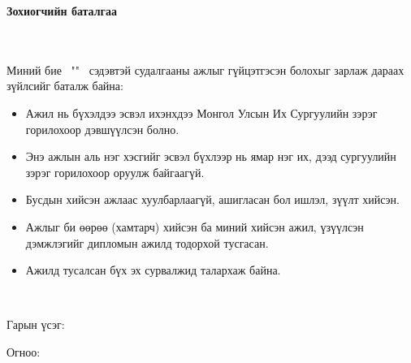 \makefrontpage
\maketitle

\doublespace

\begin{sloppy}
\begin{huge}
\textbf{Зохиогчийн баталгаа}
\end{huge} \\ \ \\ 
\doublespace
Миний бие \@author \ "\@title" \ сэдэвтэй судалгааны ажлыг гүйцэтгэсэн болохыг зарлаж дараах зүйлсийг баталж байна:
\begin{itemize}
\item Ажил нь бүхэлдээ эсвэл ихэнхдээ Монгол Улсын Их Сургуулийн зэрэг горилохоор дэвшүүлсэн болно.
\item Энэ ажлын аль нэг хэсгийг эсвэл бүхлээр нь ямар нэг их, дээд сургуулийн зэрэг горилохоор оруулж байгаагүй.
\item Бусдын хийсэн ажлаас хуулбарлаагүй, ашигласан бол ишлэл, зүүлт хийсэн.
\item Ажлыг би өөрөө (хамтарч) хийсэн ба миний хийсэн ажил, үзүүлсэн дэмжлэгийг дипломын ажилд тодорхой тусгасан. 
\item Ажилд тусалсан бүх эх сурвалжид талархаж байна. 
\end{itemize}
\end{sloppy}
\

Гарын үсэг: \underline{\hspace{5cm}} 

Огноо: 	\ \ \underline{\hspace{3cm}}

\setcounter{tocdepth}{1}
\begin{sloppy}
    \tableofcontents
\end{sloppy}
\listoffigures

\listoftables

\begin{sloppy}
    \lstlistoflistings
\end{sloppy}
\newpage
\newpage

\renewcommand{\cftlabel}{Зураг}


\doublespace
{}
